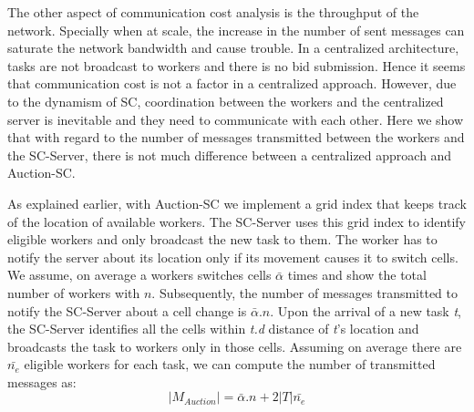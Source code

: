 The other aspect of communication cost analysis is the throughput of the network. Specially when at scale, the increase in the number of sent messages can saturate the network bandwidth and cause trouble. In a centralized architecture, tasks are not broadcast to workers and there is no bid submission. Hence it seems that communication cost is not a factor in a centralized approach. However, due to the dynamism of SC, coordination between the workers and the centralized server is inevitable and they need to communicate with each other. Here we show that with regard to the number of messages transmitted between the workers and the SC-Server, there is not much difference between a centralized approach and Auction-SC.

As explained earlier, with Auction-SC we implement a grid index that keeps track of the location of available workers. The SC-Server uses this grid index to identify eligible workers and only broadcast the new task to them. The worker has to notify the server about its location only if its movement causes it to switch cells. We assume, on average a workers switches cells $\bar{\alpha}$ times and show the total number of workers with $n$. Subsequently, the number of messages transmitted to notify the SC-Server about a cell change is $\bar{\alpha}.n$. Upon the arrival of a new task \textit{t}, the SC-Server identifies all the cells within \textit{t.d} distance of \textit{t}'s location and broadcasts the task to workers only in those cells. Assuming on average there are $\bar{n_e}$ eligible workers for each task, we can compute the number of transmitted messages as:
\begin{equation*}
\left| M_{Auction} \right| = \bar{\alpha}.n + 2|T|\bar{n_e}
\end{equation*}

